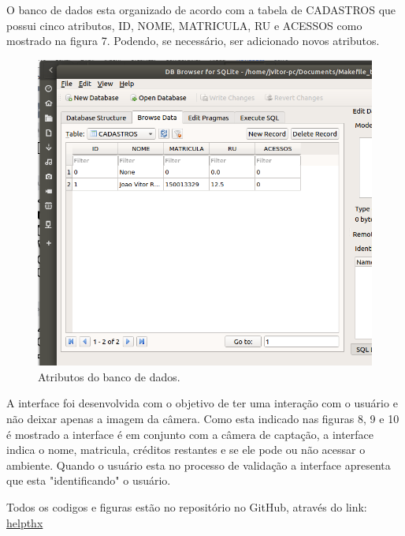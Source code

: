 \documentclass[conference,compsoc]{IEEEtran}
\begin{document}
O banco de dados esta organizado de acordo com a tabela de CADASTROS que possui cinco atributos, ID, NOME, MATRICULA, RU e ACESSOS como mostrado na figura 7. Podendo, se necessário, ser adicionado novos atributos.  


 \begin{figure}[!ht]
		\centering
		\includegraphics[scale=0.25]{infra_database.png}
		\caption{Atributos do banco de dados.}
\end{figure}

A interface foi desenvolvida com o objetivo de ter uma interação com o usuário e não deixar apenas a imagem da câmera. Como esta indicado nas figuras 8, 9 e 10 é mostrado a  interface é em conjunto com a câmera de captação, a interface indica o nome, matricula, créditos restantes e se ele pode ou não acessar o ambiente. Quando o usuário esta no processo de validação a interface apresenta que esta "identificando" o usuário.  


Todos os codigos e figuras estão no repositório no GitHub, através do link:
\href{https://github.com/helpthx/Sistemas_Embarcados/tree/master/2_PCs/Ponto_de_Controle_3/Arquivos}{helpthx}
\end{document}

